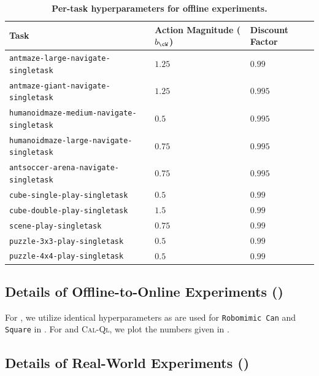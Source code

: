 \begin{table}[H]
\caption{
\footnotesize
\textbf{Per-task \algname hyperparameters for offline experiments.}
}
\vspace{5pt}
\label{table:offline_pertask_hyp}
\begin{center}
\scalebox{0.9}
{
\begin{tabular}{lll}
    \toprule
    \textbf{Task} & \textbf{Action Magnitude ($\actmag$)} & \textbf{Discount Factor} \\
    \midrule
    \texttt{antmaze-large-navigate-singletask} & $1.25$ & $0.99$ \\
    \texttt{antmaze-giant-navigate-singletask} & $1.25$ & $0.995$ \\
    \texttt{humanoidmaze-medium-navigate-singletask} & $0.5$ & $0.995$ \\
    \texttt{humanoidmaze-large-navigate-singletask} & $0.75$ & $0.995$ \\
    \texttt{antsoccer-arena-navigate-singletask} & $0.75$ & $0.995$ \\
    \texttt{cube-single-play-singletask} & $0.5$ & $0.99$ \\
    \texttt{cube-double-play-singletask} & $1.5$ & $0.99$ \\
    \texttt{scene-play-singletask} & $0.75$ & $0.99$ \\
    \texttt{puzzle-3x3-play-singletask} & $0.5$ & $0.99$ \\
    \texttt{puzzle-4x4-play-singletask} & $0.5$ & $0.99$ \\
    \bottomrule
\end{tabular}
}
\end{center}
\end{table} 



\subsection{Details of Offline-to-Online Experiments ()}
For \algname, we utilize identical hyperparameters as are used for \texttt{Robomimic Can} and \texttt{Square} in . For \rlpd and \textsc{Cal-Ql}, we plot the numbers given in \cite{ren2024diffusion}.







\subsection{Details of Real-World Experiments ()}


